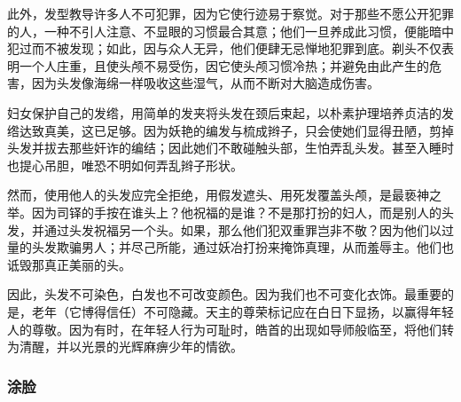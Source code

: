 此外，发型教导许多人不可犯罪，因为它使行迹易于察觉。对于那些不愿公开犯罪的人，一种不引人注意、不显眼的习惯最合其意；他们一旦养成此习惯，便能暗中犯过而不被发现；如此，因与众人无异，他们便肆无忌惮地犯罪到底。剃头不仅表明一个人庄重，且使头颅不易受伤，因它使头颅习惯冷热；并避免由此产生的危害，因为头发像海绵一样吸收这些湿气，从而不断对大脑造成伤害。\par

妇女保护自己的发绺，用简单的发夹将头发在颈后束起，以朴素护理培养贞洁的发绺达致真美，这已足够。因为妖艳的编发与梳成辫子，只会使她们显得丑陋，剪掉头发并拔去那些奸诈的编结；因此她们不敢碰触头部，生怕弄乱头发。甚至入睡时也提心吊胆，唯恐不明如何弄乱辫子形状。\par

然而，使用他人的头发应完全拒绝，用假发遮头、用死发覆盖头颅，是最亵神之举。因为司铎的手按在谁头上？他祝福的是谁？不是那打扮的妇人，而是别人的头发，并通过头发祝福另一个头。如果，那么他们犯双重罪岂非不敬？因为他们以过量的头发欺骗男人；并尽己所能，通过妖冶打扮来掩饰真理，从而羞辱主。他们也诋毁那真正美丽的头。\par

因此，头发不可染色，白发也不可改变颜色。因为我们也不可变化衣饰。最重要的是，老年（它博得信任）不可隐藏。天主的尊荣标记应在白日下显扬，以赢得年轻人的尊敬。因为有时，在年轻人行为可耻时，皓首的出现如导师般临至，将他们转为清醒，并以光景的光辉麻痹少年的情欲。\par


\subsubsection{涂脸}

